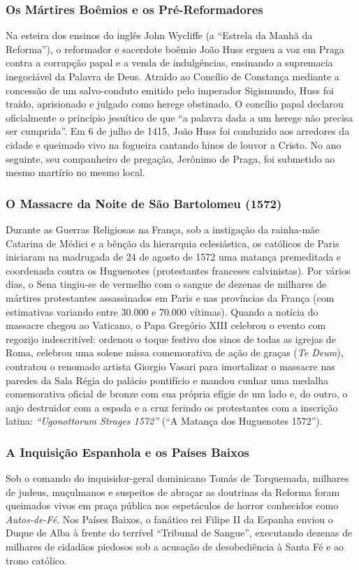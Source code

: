 \subsubsection*{Os Mártires Boêmios e os Pré-Reformadores}
Na esteira dos ensinos do inglês John Wycliffe (a ``Estrela da Manhã da Reforma''), o reformador e sacerdote boêmio João Huss ergueu a voz em Praga contra a corrupção papal e a venda de indulgências, ensinando a supremacia inegociável da Palavra de Deus. Atraído ao Concílio de Constança mediante a concessão de um salvo-conduto emitido pelo imperador Sigismundo, Huss foi traído, aprisionado e julgado como herege obstinado. O concílio papal declarou oficialmente o princípio jesuítico de que ``a palavra dada a um herege não precisa ser cumprida''. Em 6 de julho de 1415, João Huss foi conduzido aos arredores da cidade e queimado vivo na fogueira cantando hinos de louvor a Cristo. No ano seguinte, seu companheiro de pregação, Jerônimo de Praga, foi submetido ao mesmo martírio no mesmo local.


\subsubsection*{O Massacre da Noite de São Bartolomeu (1572)}
Durante as Guerras Religiosas na França, sob a instigação da rainha-mãe Catarina de Médici e a bênção da hierarquia eclesiástica, os católicos de Paris iniciaram na madrugada de 24 de agosto de 1572 uma matança premeditada e coordenada contra os Huguenotes (protestantes franceses calvinistas). Por vários dias, o Sena tingiu-se de vermelho com o sangue de dezenas de milhares de mártires protestantes assassinados em Paris e nas províncias da França (com estimativas variando entre 30.000 e 70.000 vítimas). Quando a notícia do massacre chegou ao Vaticano, o Papa Gregório XIII celebrou o evento com regozijo indescritível: ordenou o toque festivo dos sinos de todas as igrejas de Roma, celebrou uma solene missa comemorativa de ação de graças (\textit{Te Deum}), contratou o renomado artista Giorgio Vasari para imortalizar o massacre nas paredes da Sala Régia do palácio pontifício e mandou cunhar uma medalha comemorativa oficial de bronze com sua própria efígie de um lado e, do outro, o anjo destruidor com a espada e a cruz ferindo os protestantes com a inscrição latina: \textit{``Ugonottorum Strages 1572''} (``A Matança dos Huguenotes 1572'').


\subsubsection*{A Inquisição Espanhola e os Países Baixos}
Sob o comando do inquisidor-geral dominicano Tomás de Torquemada, milhares de judeus, muçulmanos e suspeitos de abraçar as doutrinas da Reforma foram queimados vivos em praça pública nos espetáculos de horror conhecidos como \textit{Autos-de-Fé}. Nos Países Baixos, o fanático rei Filipe II da Espanha enviou o Duque de Alba à frente do terrível ``Tribunal de Sangue'', executando dezenas de milhares de cidadãos piedosos sob a acusação de desobediência à Santa Fé e ao trono católico.

